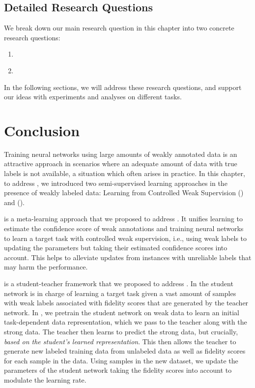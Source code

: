 \subsection{Detailed Research Questions}
We break down our main research question in this chapter into two concrete research questions:
\begin{resqbox}
\begin{enumerate}
\item[\textbf{\resqname{c5.1}}] \emph{}
\item[\textbf{\resqname{c5.2}}] \emph{}
\end{enumerate}
\end{resqbox}
In the following sections, we will address these research questions, and support our ideas with experiments and analyses on different tasks.







\section{Conclusion}
Training neural networks using large amounts of weakly annotated data is an attractive approach in scenarios where an adequate amount of data with true labels is not available, a situation which often arises in practice.
%
In this chapter, to address \textbf{}, we introduced two semi-supervised learning approaches in the presence of weakly labeled data: Learning from Controlled Weak Supervision (\cws) and \fwlfulllc (\fwl).

\cws is a meta-learning approach that we proposed to address \textbf{}. It unifies learning to estimate the confidence score of weak annotations and training neural networks to learn a target task with controlled weak supervision, i.e., using weak labels to updating the parameters but taking their estimated confidence scores into account. This helps to alleviate updates from instances with unreliable labels that may harm the performance.

\fwl is a student-teacher framework that we proposed to address \textbf{}. In \fwl the student network is in charge of learning a target task given a vast amount of samples with weak labels associated with fidelity scores that are generated by the teacher network. In \fwl, we pretrain the student network on weak data to learn an initial task-dependent data representation, which we pass to the teacher along with the strong data. The teacher then learns to predict the strong data, but crucially, \emph{based on the student's learned representation}. This then allows the teacher to generate new labeled training data from unlabeled data as well as fidelity scores for each sample in the data. Using samples in the new dataset, we update the parameters of the student network taking the fidelity scores into account to modulate the learning rate. 

